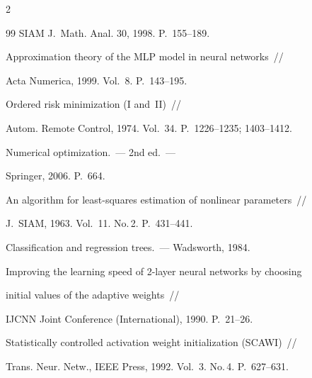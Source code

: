 \begin{multicols}{2}
{{\begin{thebibliography}{99}
SIAM J.~Math. Anal. 30, 1998. P.~155--189.





  Approximation theory of the MLP model in neural networks~//

  Acta Numerica, 1999. Vol.~8. P.~143--195.

  




 {Ordered risk minimization (I and~II)}~// 

Autom. Remote Control, 1974. Vol.~34. P.~1226--1235; 1403--1412.





Numerical optimization.~--- 2nd ed.~---

  Springer, 2006. P.~664.





  An algorithm for least-squares estimation of nonlinear parameters~//

  J.~SIAM, 1963. Vol.~11. No.\,2. P.~431--441.





  Classification and regression trees.~--- Wadsworth, 1984.





  Improving the learning speed of 2-layer neural networks by choosing

      initial values of the adaptive weights~//

  IJCNN  Joint Conference (International), 1990. P.~21--26.





  Statistically controlled activation weight initialization (SCAWI)~//

  Trans. Neur. Netw., IEEE Press, 1992. Vol.~3. No.\,4. P.~627--631.




\end{thebibliography}}}
\end{multicols}
